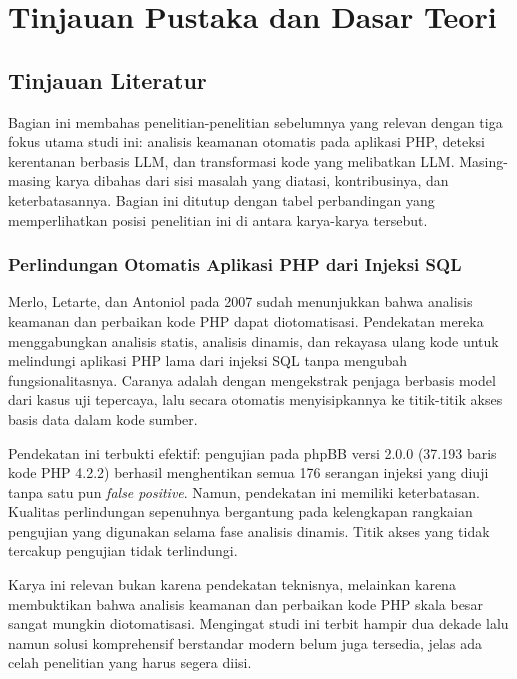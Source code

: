     \chapter{Tinjauan Pustaka dan Dasar Teori}

    \section{Tinjauan Literatur}

    Bagian ini membahas penelitian-penelitian sebelumnya yang relevan dengan tiga fokus utama studi ini: analisis keamanan otomatis pada aplikasi PHP, deteksi kerentanan berbasis LLM, dan transformasi kode yang melibatkan LLM. Masing-masing karya dibahas dari sisi masalah yang diatasi, kontribusinya, dan keterbatasannya. Bagian ini ditutup dengan tabel perbandingan yang memperlihatkan posisi penelitian ini di antara karya-karya tersebut.

    \subsection{Perlindungan Otomatis Aplikasi PHP dari Injeksi SQL}

    Merlo, Letarte, dan Antoniol \cite{merlo2007automated} pada 2007 sudah menunjukkan bahwa analisis keamanan dan perbaikan kode PHP dapat diotomatisasi. Pendekatan mereka menggabungkan analisis statis, analisis dinamis, dan rekayasa ulang kode untuk melindungi aplikasi PHP lama dari injeksi SQL tanpa mengubah fungsionalitasnya. Caranya adalah dengan mengekstrak penjaga berbasis model dari kasus uji tepercaya, lalu secara otomatis menyisipkannya ke titik-titik akses basis data dalam kode sumber.

    Pendekatan ini terbukti efektif: pengujian pada phpBB versi 2.0.0 (37.193 baris kode PHP 4.2.2) berhasil menghentikan semua 176 serangan injeksi yang diuji tanpa satu pun \textit{false positive}. Namun, pendekatan ini memiliki keterbatasan. Kualitas perlindungan sepenuhnya bergantung pada kelengkapan rangkaian pengujian yang digunakan selama fase analisis dinamis. Titik akses yang tidak tercakup pengujian tidak terlindungi.

    Karya ini relevan bukan karena pendekatan teknisnya, melainkan karena membuktikan bahwa analisis keamanan dan perbaikan kode PHP skala besar sangat mungkin diotomatisasi. Mengingat studi ini terbit hampir dua dekade lalu namun solusi komprehensif berstandar modern belum juga tersedia, jelas ada celah penelitian yang harus segera diisi.

